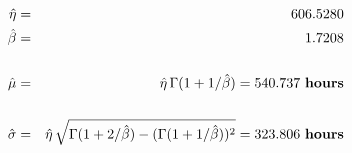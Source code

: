 \documentclass[12pt]{article}
\begin{document}
\pagestyle{empty}
\Large
{}
\pagecolor{ehandbook}

\boldmath
\begin{eqnarray*}
\hat{\eta} &=& 606.5280 \\
\hat{\beta} &=& 1.7208 \\
\\
\hat{\mu} &=& \hat{\eta} \, \Gamma(1 + 1/\hat{\beta}) = 540.737 \,\, \mbox{\bf hours}\\
\\
\hat{\sigma} &=& \hat{\eta} \, \sqrt{\Gamma(1+2/\hat{\beta}) - 
(\Gamma(1+1/\hat{\beta}))^{2}} = 323.806 \,\, \mbox{\bf hours}
\end{eqnarray*}
\end{document}
